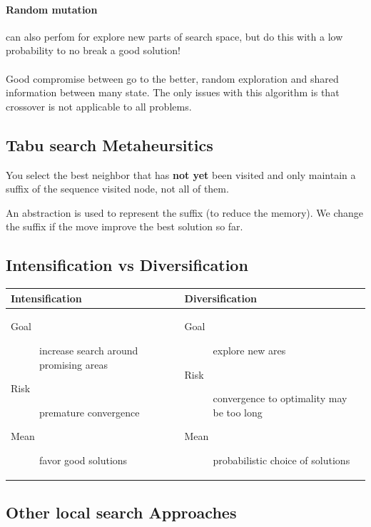 \paragraph{Random mutation } can also perfom for explore new parts of
search space, but do this with a low probability to no break a good solution!


\paragraph{ } 
Good compromise between go to the better, random exploration and shared information
between many state.
The only issues with this algorithm is that crossover is not applicable to all problems.

\subsection{Tabu search Metaheursitics}
You select  the best  neighbor that  has \textbf{not yet}  been visited  and only
maintain a suffix of the sequence visited node, not all of them.

An abstraction is used to represent the suffix (to reduce the memory). We change the suffix
if the move improve the best solution so far.

\subsection{Intensification vs Diversification}
\begin{tabular}{m{8cm}|m{8cm}}
Intensification & Diversification \\
\hline

	\begin{description}
		\item[Goal] increase search around promising areas
		\item[Risk] premature convergence
		\item[Mean] favor good solutions
	\end{description}
&
	\begin{description}
		\item[Goal] explore new ares
		\item[Risk] convergence to optimality may be too long
		\item[Mean] probabilistic choice of solutions
	\end{description}
\end{tabular}

\subsection{Other local search Approaches}

